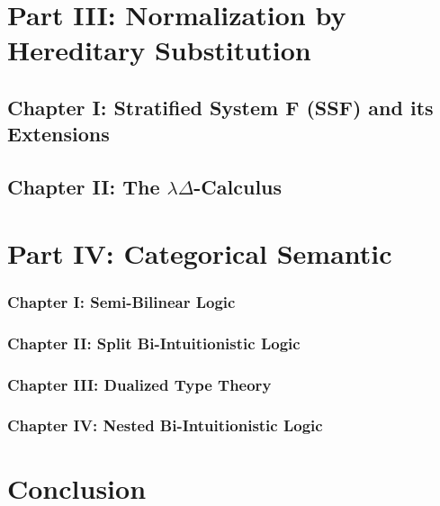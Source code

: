\section{Part III: Normalization by Hereditary Substitution}
\label{sec:normalization_by_hereditary_substitution}
\subsection{Chapter I: Stratified System F (SSF) and its Extensions}
\label{subsec:stratified_system_f_ext}


\subsection{Chapter II: The $\lambda\Delta$-Calculus}
\label{subsec:the_lambdadelta-calculus}



\section{Part IV: Categorical Semantic }
\label{sec:categorical_semantics}

\subsubsection{Chapter I: Semi-Bilinear Logic}
\label{subsec:semi-bilinear_logic}


\subsubsection{Chapter II: Split Bi-Intuitionistic Logic}
\label{subsec:split_bi-intuitionistic_logic}


\subsubsection{Chapter III: Dualized Type Theory}
\label{subsubsec:dualized_type_theory}


\subsubsection{Chapter IV: Nested Bi-Intuitionistic Logic}
\label{subsec:nested_bi-intuitionistic_logic}


\section{Conclusion}
\label{sec:conclusion}


 

